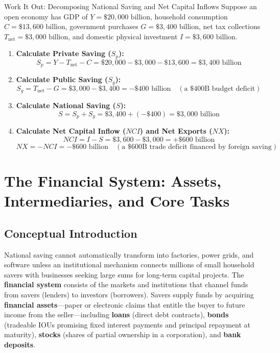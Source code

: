 \documentclass[11pt,letterpaper]{article}
\begin{document}
\begin{examplecase}{Work It Out: Decomposing National Saving and Net Capital Inflows}
Suppose an open economy has GDP of $Y = \$20{,}000\text{ billion}$, household consumption $C = \$13{,}600\text{ billion}$, government purchases $G = \$3{,}400\text{ billion}$, net tax collections $T_{\text{net}} = \$3{,}000\text{ billion}$, and domestic physical investment $I = \$3{,}600\text{ billion}$.
\begin{enumerate}
  \item \textbf{Calculate Private Saving ($S_p$):}
  $$S_p = Y - T_{\text{net}} - C = \$20{,}000 - \$3{,}000 - \$13{,}600 = \$3{,}400\text{ billion}$$
  \item \textbf{Calculate Public Saving ($S_g$):}
  $$S_g = T_{\text{net}} - G = \$3{,}000 - \$3{,}400 = -\$400\text{ billion} \quad (\text{a } \$400\text{B budget deficit})$$
  \item \textbf{Calculate National Saving ($S$):}
  $$S = S_p + S_g = \$3{,}400 + (-\$400) = \$3{,}000\text{ billion}$$
  \item \textbf{Calculate Net Capital Inflow ($NCI$) and Net Exports ($NX$):}
  $$NCI = I - S = \$3{,}600 - \$3{,}000 = +\$600\text{ billion}$$
  $$NX = -NCI = -\$600\text{ billion} \quad (\text{a } \$600\text{B trade deficit financed by foreign saving})$$
\end{enumerate}
\end{examplecase}

\section{The Financial System: Assets, Intermediaries, and Core Tasks}

\subsection*{Conceptual Introduction}
National saving cannot automatically transform into factories, power grids, and software unless an institutional mechanism connects millions of small household savers with businesses seeking large sums for long-term capital projects. The \textbf{financial system} consists of the markets and institutions that channel funds from savers (lenders) to investors (borrowers). Savers supply funds by acquiring \textbf{financial assets}—paper or electronic claims that entitle the buyer to future income from the seller—including \textbf{loans} (direct debt contracts), \textbf{bonds} (tradeable IOUs promising fixed interest payments and principal repayment at maturity), \textbf{stocks} (shares of partial ownership in a corporation), and \textbf{bank deposits}.
\end{document}
